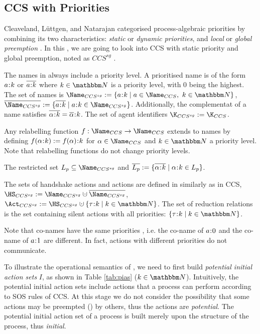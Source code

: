 \documentclass[adraft,hidelinks]{eptcs}
\begin{document}
\subsection{CCS with Priorities}
\label{sec:ccssg}
Cleaveland, Lüttgen, and Natarajan categorised process-algebraic priorities by combining its two characteristics: \emph{static} or \emph{dynamic priorities}, and \emph{local} or \emph{global preemption} \cite{CLN01}.
In this \this, we are going to look into CCS with static priority and global preemption, noted as $CCS^{sg}$ \cite{CLN01}.

The names in \CSG always include a priority level.
A prioritised name is of the form $a\hspace{-0.8mm}:\hspace{-0.8mm} k$ or $\overline{a\hspace{-0.8mm}:\hspace{-0.8mm} k}$ where $k\in\IN$ is a priority level, with $0$ being the highest.
The set of \CSG names is $\Name_{CCS^{sg}} := \{a\cln k \mid a\in\Name_{CCS},\ k\in\IN\}$, $\overline{\Name_{CCS^{sg}}} := \{\overline{a\cln k} \mid a\cln k\in\Name_{CCS^{sg}}\}$.
Additionally, the complementat of a name satisfies $\overline{\alpha\hspace{-0.8mm}:\hspace{-0.8mm} k} = \overline{\alpha}\hspace{-0.8mm}:\hspace{-0.8mm} k$.
The set of agent identifiers $\K_{CCS^{sg}} := \K_{CCS}$.

Any relabelling function $f: \Name_{CCS}\to\Name_{CCS}$ extends to \CSG names by defining $f(\alpha\hspace{-0.8mm}:\hspace{-0.8mm} k):=f(\alpha)\hspace{-0.8mm}:\hspace{-0.8mm} k$ for $\alpha\in\Name_{CCS}$ and $k\in\IN$ a priority level.
Note that relabelling functions do not change priority levels.

The restricted set $L_p\subseteq \Name_{CCS^{sg}}$ and $\overline{L_p}:=\{\overline{\alpha\hspace{-0.8mm}:\hspace{-0.8mm} k} \mid \alpha\hspace{-0.8mm}:\hspace{-0.8mm} k\in L_p \}$.

The sets of handshake actions and actions are defined in \CSG similarly as in CCS, $\HS_{CCS^{sg}} := \Name_{CCS^{sg}} \dcup \overline{\Name_{CCS^{sg}}}$, $\Act_{CCS^{sg}} := \HS_{CCS^{sg}} \dcup \{\tau\cln k\mid k\in \IN\}$.
The set of reduction relations is the set containing silent actions with all priorities: $\{\tau\cln k\mid k\in \IN\}$.

Note that co-names have the same priorities , i.e. the co-name of $a\hspace{-0.8mm}:\hspace{-0.8mm} 0$ and the co-name of $a\hspace{-0.8mm}:\hspace{-0.8mm} 1$ are different.
In fact, actions with different priorities do not communicate.

To illustrate the operational semantics of \CSG, we need to first build \emph{potential initial action sets} $I$, as shown in Table \ref{tab:pias} ($k\in\IN$).
Intuitively, the potential initial action sets include actions that a process can perform according to SOS rules of CCS.
At this stage we do not consider the possibility that some actions may be preempted () by others, thus the actions are \emph{potential}.
The potential initial action set of a process is built merely upon the structure of the process, thus \emph{initial}.
\end{document}
